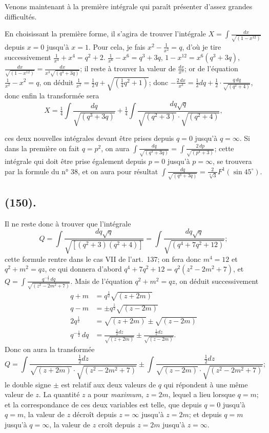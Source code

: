\documentclass{article}
\begin{document}
Venons maintenant à la première intégrale qui paraît présenter d'assez grandes difficultés.

En choisissant la première forme, il s'agira de trouver l'intégrale $X=\displaystyle\int\frac{dx}{\sqrt{(1-x^{12})}}$ depuis $x=0$ jusqu'à $x=1$. Pour cela, je fais $x^{2}-\frac{1}{x^{2}}=q$, d'où je tire successivement $\frac{1}{x^{4}}+x^{4}=q^{2}+2$. $\frac{1}{x^{6}}-x^{6}=q^{3}+3q$, $1-x^{12}=x^{6}(q^{3}+3q)$, $\frac{dx}{\sqrt{(1-x^{12})}}=\frac{dx}{x^{3}\sqrt{(q^{3}+3q)}}$; il reste à trouver la valeur de $\frac{dx}{x^{3}}$; or de l'équation $\frac{1}{x^{2}}-x^{2}=q$, on déduit $\frac{1}{x^{2}}=\frac{1}{2}q+\sqrt{(\frac{1}{4}q^{2}+1)}$; donc $-\frac{2\,dx}{x^{3}}=\frac{1}{2}dq+\frac{1}{2}\cdot\frac{q\,dq}{\sqrt{(q^{2}+4)}}$, donc enfin la transformée sera
\[ X=\tfrac{1}{4}\int\frac{dq}{\sqrt{(q^{3}+3q)}}+\tfrac{1}{4}\int\frac{dq\sqrt{q}}{\sqrt{(q^{2}+3)}\cdot\sqrt{(q^{2}+4)}}, \]

ces deux nouvelles intégrales devant être prises depuis $q=0$ jusqu'à $q=\infty$. Si dans la première on fait $q=p^{2}$, on aura $\displaystyle\int\frac{dq}{\sqrt{(q^{3}+3q)}}=\int\frac{2\,dp}{\sqrt{(p^{4}+3)}}$; cette intégrale qui doit être prise également depuis $p=0$ jusqu'à $p=\infty$, se trouvera par la formule du n° 38, et on aura pour résultat $\displaystyle\int\frac{dq}{\sqrt{(q^{3}+3q)}}=\frac{2}{\sqrt[4]{3}}F^{1}(\sin 45^{\circ})$.

\subsection*{(150).}

Il ne reste donc à trouver que l'intégrale
\[ Q=\int\frac{dq\sqrt{q}}{\sqrt{[(q^{2}+3)(q^{2}+4)]}}=\int\frac{dq\sqrt{q}}{\sqrt{(q^{4}+7q^{2}+12)}}; \]
cette formule rentre dans le cas VII de l'art.\ 137; on fera donc $m^{4}=12$ et $q^{2}+m^{2}=qz$, ce qui donnera d'abord $q^{4}+7q^{2}+12=q^{2}(z^{2}-2m^{2}+7)$, et $Q=\displaystyle\int\frac{q^{-\frac{1}{2}}\,dq}{\sqrt{(z^{2}-2m^{2}+7)}}$. Mais de l'équation $q^{2}+m^{2}=qz$, on déduit successivement
\[ \begin{aligned} q+m&=q^{\frac{1}{2}}\sqrt{(z+2m)}\\ q-m&=\pm q^{\frac{1}{2}}\sqrt{(z-2m)}\\ 2q^{\frac{1}{2}}&=\sqrt{(z+2m)}\pm\sqrt{(z-2m)}\\ q^{-\frac{1}{2}}\,dq&=\frac{\tfrac{1}{2}dz}{\sqrt{(z+2m)}}\pm\frac{\tfrac{1}{2}dz}{\sqrt{(z-2m)}}. \end{aligned} \]
Donc on aura la transformée
\[ Q=\int\frac{\tfrac{1}{2}dz}{\sqrt{(z+2m)}\cdot\sqrt{(z^{2}-2m^{2}+7)}}\pm\int\frac{\tfrac{1}{2}dz}{\sqrt{(z-2m)}\cdot\sqrt{(z^{2}-2m^{2}+7)}}; \]
le double signe $\pm$ est relatif aux deux valeurs de $q$ qui répondent à une même valeur de $z$. La quantité $z$ a pour \emph{maximum}, $z=2m$, lequel a lieu lorsque $q=m$; et la correspondance de ces deux variables est telle, que depuis $q=0$ jusqu'à $q=m$, la valeur de $z$ décroît depuis $z=\infty$ jusqu'à $z=2m$; et depuis $q=m$ jusqu'à $q=\infty$, la valeur de $z$ croît depuis $z=2m$ jusqu'à $z=\infty$.
\end{document}
